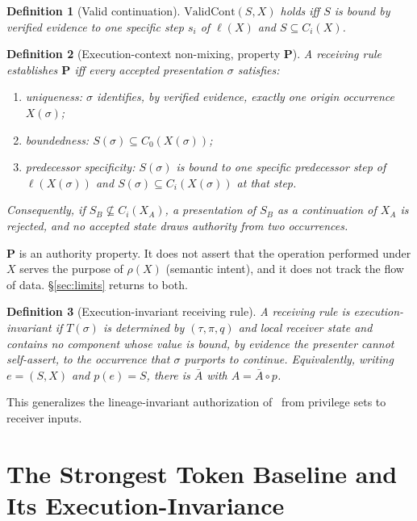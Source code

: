 \documentclass[conference]{IEEEtran}
\newcommand{\ValidCont}{\mathrm{ValidCont}}
\newtheorem{definition}{Definition}
\begin{document}
\begin{definition}[Valid continuation]\label{def:validcont}
$\ValidCont(S,X)$ holds iff $S$ is bound by verified evidence to one specific step $s_i$ of $\ell(X)$ and $S\subseteq C_i(X)$.
\end{definition}

\begin{definition}[Execution-context non-mixing, property $\mathbf{P}$]\label{def:P}
A receiving rule \emph{establishes} $\mathbf{P}$ iff every accepted presentation $\sigma$ satisfies:
\begin{enumerate}
\item[(i)] \emph{uniqueness}: $\sigma$ identifies, by verified evidence, exactly one origin occurrence $X(\sigma)$;
\item[(ii)] \emph{boundedness}: $S(\sigma)\subseteq C_0(X(\sigma))$;
\item[(iii)] \emph{predecessor specificity}: $S(\sigma)$ is bound to one specific predecessor step of $\ell(X(\sigma))$ and $S(\sigma)\subseteq C_i(X(\sigma))$ at that step.
\end{enumerate}
Consequently, if $S_B\not\subseteq C_i(X_A)$, a presentation of $S_B$ as a continuation of $X_A$ is rejected, and no accepted state draws authority from two occurrences.
\end{definition}

$\mathbf{P}$ is an authority property. It does not assert that the operation performed under $X$ serves the purpose of $\rho(X)$ (semantic intent), and it does not track the flow of data. \S\ref{sec:limits} returns to both.

\begin{definition}[Execution-invariant receiving rule]\label{def:invariant}
A receiving rule is \emph{execution-invariant} if $T(\sigma)$ is determined by $(\tau,\pi,q)$ and local receiver state and contains no component whose value is bound, by evidence the presenter cannot self-assert, to the occurrence that $\sigma$ purports to continue. Equivalently, writing $e=(S,X)$ and $p(e)=S$, there is $\bar A$ with $A=\bar A\circ p$.
\end{definition}

This generalizes the lineage-invariant authorization of~\cite[Defs.~7--8]{gallo2026poc} from privilege sets to receiver inputs.

\section{The Strongest Token Baseline and Its Execution-Invariance}\label{sec:baseline}
\end{document}
